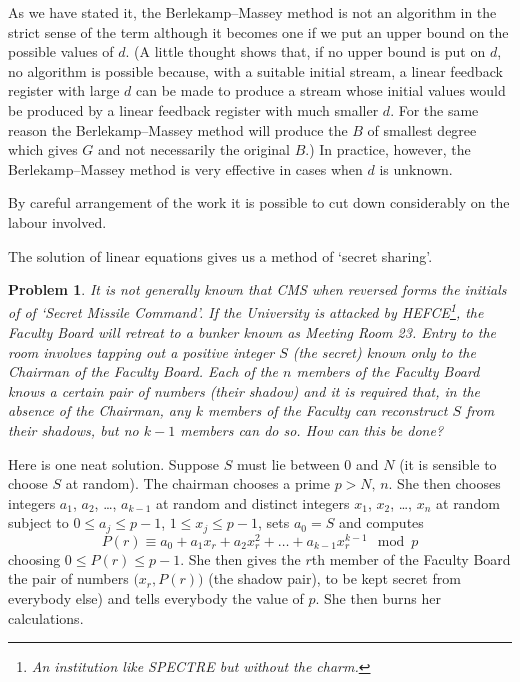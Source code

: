 \documentclass[12pt,a4paper]{article}
\theoremstyle{plain}
\newtheorem{problem}[theorem]{Problem}
\theoremstyle{definition}
\begin{document}
As we have stated it, the Berlekamp--Massey method
is not an algorithm in the strict sense
of the term although it becomes one if we put an
upper bound on the possible values of $d$. (A little
thought shows that, if no upper bound is put on $d$,
no algorithm is possible because, with a suitable
initial stream, a linear feedback register with
large $d$ can be made to produce a stream whose
initial values would be produced by
a linear feedback register with much smaller $d$.
For the same reason the Berlekamp--Massey method
will produce the $B$ of smallest degree which
gives $G$ and not necessarily the original $B$.)
In practice, however, the Berlekamp--Massey method
is very effective in cases when $d$ is unknown.

By careful arrangement of the work it is possible
to cut down considerably  on the labour involved.

The solution of linear equations gives us
a method of `secret sharing'\label{P;secret sharing}.
\begin{problem} It is not generally known that
CMS when reversed forms the initials of 
of `Secret Missile Command'. If the University is
attacked by HEFCE\footnote{An institution like
SPECTRE but without the charm.}, the Faculty Board
will retreat to a bunker known as
Meeting Room 23. Entry to the room involves
tapping out a positive integer $S$ (the secret)
known only to the Chairman of the Faculty Board.
Each of the $n$ members of the Faculty Board
knows a certain pair of numbers (their shadow)
and it is required that, in the absence
of the Chairman, any $k$ members of the
Faculty can reconstruct $S$ from their shadows,
but no $k-1$ members can do so. How can this
be done?
\end{problem}

Here is one neat solution. Suppose $S$ must lie between
$0$ and $N$ (it is sensible to choose $S$ at random).
The chairman chooses
a prime $p>N,\,n$. She then chooses integers
$a_{1}$, $a_{2}$, \dots, $a_{k-1}$ at random
and distinct integers
$x_{1}$, $x_{2}$, \dots, $x_{n}$ at random 
subject to $0\leq a_{j}\leq p-1$, 
$1\leq x_{j}\leq p-1$, sets $a_{0}=S$
and computes 
\[P(r)\equiv a_{0}+a_{1}x_{r}+a_{2}x_{r}^{2}+\dots+a_{k-1}x_{r}^{k-1}\mod{p}\]
choosing $0\leq P(r)\leq p-1$.
She then gives the $r$th member of the Faculty Board
the pair of numbers $\big(x_{r},P(r)\big)$ (the shadow pair), 
to be kept secret
from everybody else) and tells everybody the value of $p$.
She then burns her calculations.
\end{document}
